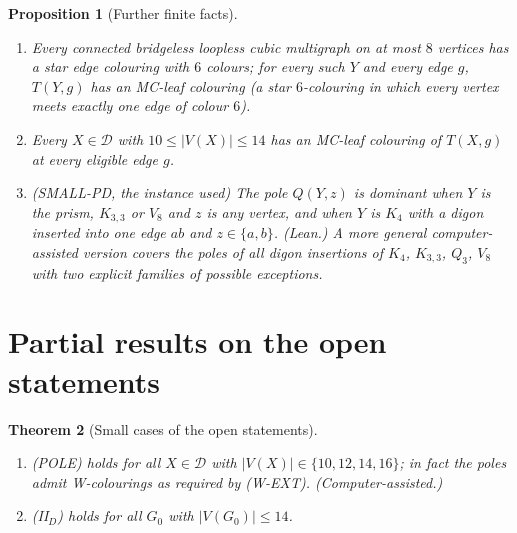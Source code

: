 \documentclass[11pt]{amsart}
\newtheorem{theorem}{Theorem}[section]
\newtheorem{proposition}[theorem]{Proposition}
\theoremstyle{definition}
\theoremstyle{remark}
\newcommand{\cD}{\mathcal{D}}
\newcommand{\hyp}[1]{\textup{(#1)}}
\newcommand{\Lean}{\textsf{Lean}}
\begin{document}
\begin{proposition}[Further finite facts]\label{prop:misc-finite}
\leavevmode
\begin{enumerate}[label=(\alph*)]
\item Every connected bridgeless loopless cubic multigraph on at most $8$ vertices has a star edge colouring with $6$ colours; for every such $Y$ and every edge $g$, $T(Y,g)$ has an MC-leaf colouring (a star $6$-colouring in which every vertex meets exactly one edge of colour $6$).
\item Every $X\in\cD$ with $10\le|V(X)|\le 14$ has an MC-leaf colouring of $T(X,g)$ at every eligible edge $g$.
\item \textup{(SMALL-PD, the instance used)} The pole $Q(Y,z)$ is dominant when $Y$ is the prism, $K_{3,3}$ or $V_8$ and $z$ is any vertex, and when $Y$ is $K_4$ with a digon inserted into one edge $ab$ and $z\in\{a,b\}$. \textup{(\Lean.)} A more general computer-assisted version covers the poles of all digon insertions of $K_4$, $K_{3,3}$, $Q_3$, $V_8$ with two explicit families of possible exceptions.
\end{enumerate}
\end{proposition}

\section{Partial results on the open statements}\label{sec:partial}

\begin{theorem}[Small cases of the open statements]\label{thm:smallcases}
\leavevmode
\begin{enumerate}[label=(\alph*)]
\item \hyp{POLE} holds for all $X\in\cD$ with $|V(X)|\in\{10,12,14,16\}$; in fact the poles admit W-colourings as required by \hyp{W-EXT}. \textup{(Computer-assisted.)}
\item \hyp{II$_D$} holds for all $G_0$ with $|V(G_0)|\le 14$.
\end{enumerate}
\end{theorem}
\end{document}
